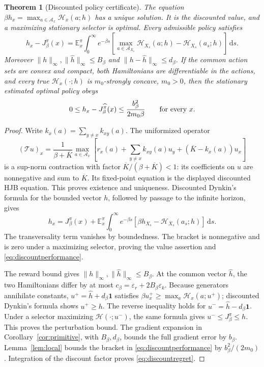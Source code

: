 \documentclass[11pt]{article}
\theoremstyle{plain}
\newtheorem{theorem}{Theorem}[section]
\theoremstyle{definition}
\theoremstyle{remark}
\newcommand{\E}{\mathbb E}
\newcommand{\dd}{\,\mathrm d}
\newcommand{\norm}[1]{\lVert#1\rVert}
\newcommand{\HH}{\mathcal H}
\newcommand{\cAct}{\mathcal A}
\begin{document}
\begin{theorem}[Discounted policy certificate]\label{thm:discounted}
The equation \(\beta h_x=\max_{a\in\cAct_x}\HH_x(a;h)\) has a unique
solution. It is the discounted value, and a maximizing stationary
selector is optimal. Every admissible policy satisfies
\begin{equation}\label{eq:discountperformance}
h_x-J_\beta^\pi(x)=\E_x^\pi\int_0^\infty e^{-\beta s}
 \left[\max_{a\in\cAct_{X_s}}\HH_{X_s}(a;h)
                         -\HH_{X_s}(a_s;h)\right]\dd s.
\end{equation}
Moreover \(\norm h_\infty,\norm{\widehat h}_\infty\le B_\beta\) and
\(\norm{h-\widehat h}_\infty\le d_\beta\).
If the common action sets are convex and compact, both Hamiltonians
are differentiable in the actions, and every true
\(\HH_x(\cdot;h)\) is \(m_0\)-strongly concave, \(m_0>0\), then the
stationary estimated optimal policy obeys
\begin{equation}\label{eq:discountregret}
0\le h_x-J_\beta^{\widehat\pi}(x)
\le \frac{b_\beta^2}{2m_0\beta}\qquad\hbox{for every }x.
\end{equation}
\end{theorem}
\begin{proof}
Write \(k_x(a)=\sum_{y\ne x}k_{xy}(a)\). The uniformized operator
\[
(\mathcal Tu)_x=\frac{1}{\beta+\overline K}
\max_{a\in\cAct_x}\left[r_x(a)+\sum_{y\ne x}k_{xy}(a)u_y
                    +(\overline K-k_x(a))u_x\right]
\]
is a sup-norm contraction with factor
\(\overline K/(\beta+\overline K)<1\): its coefficients on \(u\)
are nonnegative and sum to \(\overline K\). Its fixed-point equation
is the displayed discounted HJB equation. This proves existence and
uniqueness. Discounted Dynkin's formula for the bounded vector \(h\),
followed by passage to the infinite horizon, gives
\[
h_x=J_\beta^\pi(x)+\E_x^\pi\int_0^\infty e^{-\beta s}
 [\beta h_{X_s}-\HH_{X_s}(a_s;h)]\dd s.
\]
The transversality term vanishes by boundedness. The bracket is
nonnegative and is zero under a maximizing selector, proving the
value assertion and \eqref{eq:discountperformance}.

The reward bound gives \(\norm h_\infty,\norm{\widehat h}_\infty
\le B_\beta\). At the common vector \(\widehat h\), the two
Hamiltonians differ by at most
\(c_\beta=\varepsilon_r+2B_\beta\varepsilon_k\).
Because generators annihilate constants, \(u^+=\widehat h+d_\beta\mathbf1\)
satisfies \(\beta u_x^+\ge\max_a\HH_x(a;u^+)\); discounted Dynkin's
formula shows \(u^+\ge h\). The reverse inequality holds for
\(u^-=\widehat h-d_\beta\mathbf1\). Under a selector maximizing
\(\HH(\cdot;u^-)\), the same formula gives
\(u^-\le J_\beta^\pi\le h\). This proves the perturbation bound.
The gradient expansion in Corollary~\ref{cor:primitive}, with
\(B_\beta,d_\beta\), bounds the full gradient error by \(b_\beta\).
Lemma~\ref{lem:local} bounds the bracket in
\eqref{eq:discountperformance} by \(b_\beta^2/(2m_0)\).
Integration of the discount factor proves \eqref{eq:discountregret}.
\end{proof}
\end{document}
